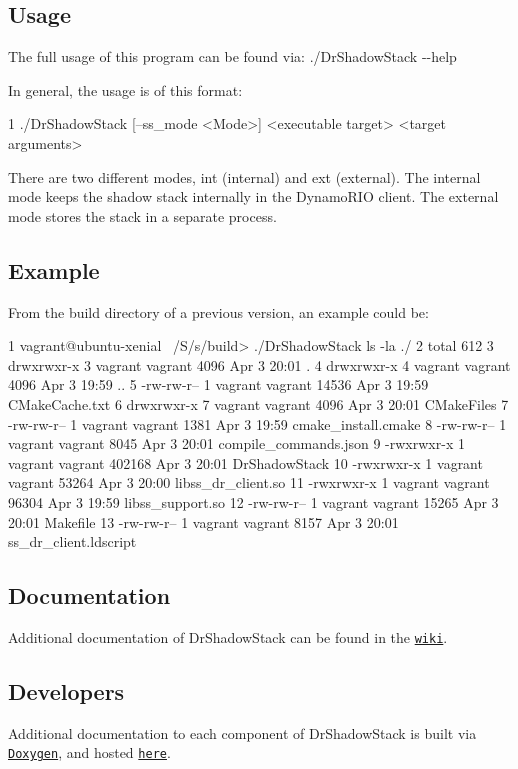 \subsection*{Usage}

The full usage of this program can be found via\+: {\ttfamily ./\+Dr\+Shadow\+Stack -\/-\/help}

In general, the usage is of this format\+: 
\begin{DoxyCode}
1 ./DrShadowStack [--ss\_mode <Mode>] <executable target> <target arguments>
\end{DoxyCode}


There are two different modes, {\ttfamily int} (internal) and {\ttfamily ext} (external). The internal mode keeps the shadow stack internally in the Dynamo\+R\+IO client. The external mode stores the stack in a separate process.

\subsection*{Example}

From the build directory of a previous version, an example could be\+: 
\begin{DoxyCode}
1 vagrant@ubuntu-xenial ~/S/s/build> ./DrShadowStack ls -la ./
2 total 612
3 drwxrwxr-x 3 vagrant vagrant   4096 Apr  3 20:01 .
4 drwxrwxr-x 4 vagrant vagrant   4096 Apr  3 19:59 ..
5 -rw-rw-r-- 1 vagrant vagrant  14536 Apr  3 19:59 CMakeCache.txt
6 drwxrwxr-x 7 vagrant vagrant   4096 Apr  3 20:01 CMakeFiles
7 -rw-rw-r-- 1 vagrant vagrant   1381 Apr  3 19:59 cmake\_install.cmake
8 -rw-rw-r-- 1 vagrant vagrant   8045 Apr  3 20:01 compile\_commands.json
9 -rwxrwxr-x 1 vagrant vagrant 402168 Apr  3 20:01 DrShadowStack
10 -rwxrwxr-x 1 vagrant vagrant  53264 Apr  3 20:00 libss\_dr\_client.so
11 -rwxrwxr-x 1 vagrant vagrant  96304 Apr  3 19:59 libss\_support.so
12 -rw-rw-r-- 1 vagrant vagrant  15265 Apr  3 20:01 Makefile
13 -rw-rw-r-- 1 vagrant vagrant   8157 Apr  3 20:01 ss\_dr\_client.ldscript
\end{DoxyCode}


\subsection*{Documentation}

Additional documentation of Dr\+Shadow\+Stack can be found in the \href{https://github.com/zwimer/DrShadowStack/wiki}{\tt wiki}.

\subsection*{Developers}

Additional documentation to each component of Dr\+Shadow\+Stack is built via \href{http://www.stack.nl/~dimitri/doxygen/}{\tt Doxygen}, and hosted \href{https://zwimer.com/DrShadowStack}{\tt here}. 